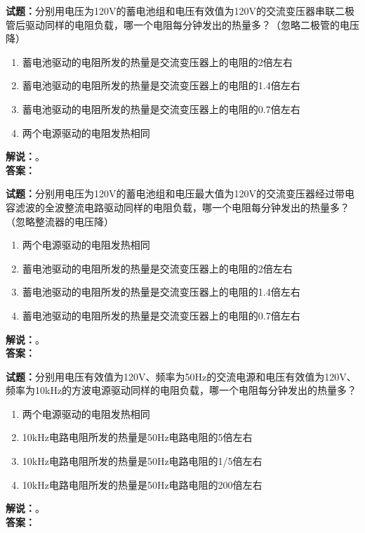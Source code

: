 \documentclass{ctexbook}
\begin{document}
\noindent\textbf{试题：}分别用电压为120V的蓄电池组和电压有效值为120V的交流变压器串联二极管后驱动同样的电阻负载，哪一个电阻每分钟发出的热量多？（忽略二极管的电压降）
\begin{enumerate}[leftmargin=3em]
\item 蓄电池驱动的电阻所发的热量是交流变压器上的电阻的2倍左右
\item 蓄电池驱动的电阻所发的热量是交流变压器上的电阻的1.4倍左右
\item 蓄电池驱动的电阻所发的热量是交流变压器上的电阻的0.7倍左右
\item 两个电源驱动的电阻发热相同
\end{enumerate}
\noindent\textbf{解说：}\textbf{}。\\\noindent\textbf{答案：}

\bigskip




\noindent\textbf{试题：}分别用电压为120V的蓄电池组和电压最大值为120V的交流变压器经过带电容滤波的全波整流电路驱动同样的电阻负载，哪一个电阻每分钟发出的热量多？（忽略整流器的电压降）
\begin{enumerate}[leftmargin=3em]
\item 两个电源驱动的电阻发热相同
\item 蓄电池驱动的电阻所发的热量是交流变压器上的电阻的2倍左右
\item 蓄电池驱动的电阻所发的热量是交流变压器上的电阻的1.4倍左右
\item 蓄电池驱动的电阻所发的热量是交流变压器上的电阻的0.7倍左右
\end{enumerate}
\noindent\textbf{解说：}\textbf{}。\\\noindent\textbf{答案：}

\bigskip




\noindent\textbf{试题：}分别用电压有效值为120V、频率为50Hz的交流电源和电压有效值为120V、频率为10\unit{\kHz}的方波电源驱动同样的电阻负载，哪一个电阻每分钟发出的热量多？
\begin{enumerate}[leftmargin=3em]
\item 两个电源驱动的电阻发热相同
\item 10\unit{\kHz}电路电阻所发的热量是50Hz电路电阻的5倍左右
\item 10\unit{\kHz}电路电阻所发的热量是50Hz电路电阻的1/5倍左右
\item 10\unit{\kHz}电路电阻所发的热量是50Hz电路电阻的200倍左右
\end{enumerate}
\noindent\textbf{解说：}\textbf{}。\\\noindent\textbf{答案：}
\end{document}
